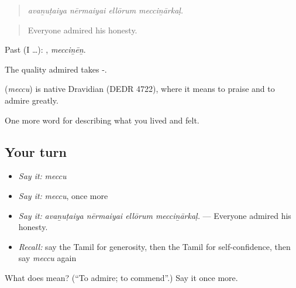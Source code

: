\begin{quote}
\emph{avaṉuṭaiya nērmaiyai ellōrum mecciṉārkaḷ.}
\end{quote}

\begin{quote}
Everyone admired his honesty.
\end{quote}

Past (I …): , \emph{mecciṉēṉ}.

The quality admired takes -.

\begin{cousinweb}
\textbf{} (\emph{meccu}) is native Dravidian (DEDR 4722), where it means to praise and to admire greatly.
\end{cousinweb}

\begin{grammarlens}[title={What you've built}]
One more word for describing what you lived and felt.
\end{grammarlens}

\subsection*{Your turn}
\begin{itemize}
\raggedright
  \item \emph{Say it:} \emph{meccu}
  \item \emph{Say it:} \emph{meccu}, once more
  \item \emph{Say it:} \emph{avaṉuṭaiya nērmaiyai ellōrum mecciṉārkaḷ.} — Everyone admired his honesty.
  \item \emph{Recall:} say the Tamil for generosity, then the Tamil for self-confidence, then say \emph{meccu} again
\end{itemize}

\begin{tcolorbox}[breakable,colback=teal!4,colframe=teal!35!black,title={Before you move on}]
What does  mean? (\textquotedblleft{}To admire; to commend\textquotedblright{}.) Say it once more.
\end{tcolorbox}
